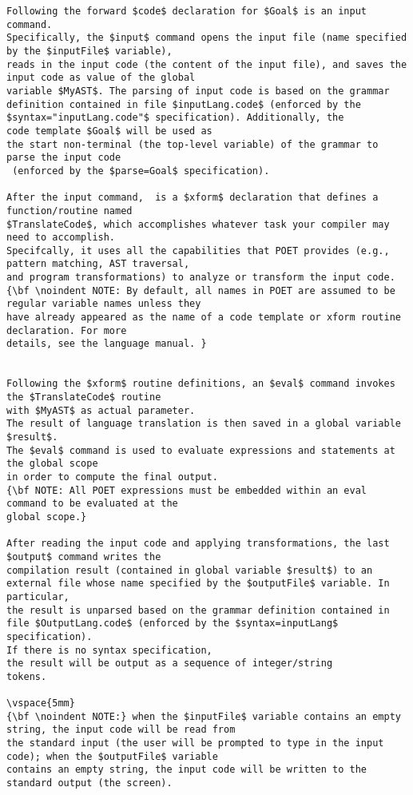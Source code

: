 \documentclass[11pt]{article}
\begin{document}
\begin {verbatim}
Following the forward $code$ declaration for $Goal$ is an input command.
Specifically, the $input$ command opens the input file (name specified by the $inputFile$ variable),
reads in the input code (the content of the input file), and saves the input code as value of the global
variable $MyAST$. The parsing of input code is based on the grammar definition contained in file $inputLang.code$ (enforced by the $syntax="inputLang.code"$ specification). Additionally, the
code template $Goal$ will be used as 
the start non-terminal (the top-level variable) of the grammar to parse the input code
 (enforced by the $parse=Goal$ specification). 

After the input command,  is a $xform$ declaration that defines a function/routine named
$TranslateCode$, which accomplishes whatever task your compiler may need to accomplish.
Specifcally, it uses all the capabilities that POET provides (e.g., pattern matching, AST traversal,
and program transformations) to analyze or transform the input code. 
{\bf \noindent NOTE: By default, all names in POET are assumed to be regular variable names unless they
have already appeared as the name of a code template or xform routine declaration. For more
details, see the language manual. }


Following the $xform$ routine definitions, an $eval$ command invokes the $TranslateCode$ routine 
with $MyAST$ as actual parameter. 
The result of language translation is then saved in a global variable $result$. 
The $eval$ command is used to evaluate expressions and statements at the global scope
in order to compute the final output. 
{\bf NOTE: All POET expressions must be embedded within an eval command to be evaluated at the
global scope.}

After reading the input code and applying transformations, the last $output$ command writes the 
compilation result (contained in global variable $result$) to an external file whose name specified by the $outputFile$ variable. In particular, 
the result is unparsed based on the grammar definition contained in file $OutputLang.code$ (enforced by the $syntax=inputLang$ specification).
If there is no syntax specification,
the result will be output as a sequence of integer/string
tokens.

\vspace{5mm}
{\bf \noindent NOTE:} when the $inputFile$ variable contains an empty string, the input code will be read from
the standard input (the user will be prompted to type in the input code); when the $outputFile$ variable
contains an empty string, the input code will be written to the standard output (the screen).


\end{verbatim}
\end{document}
